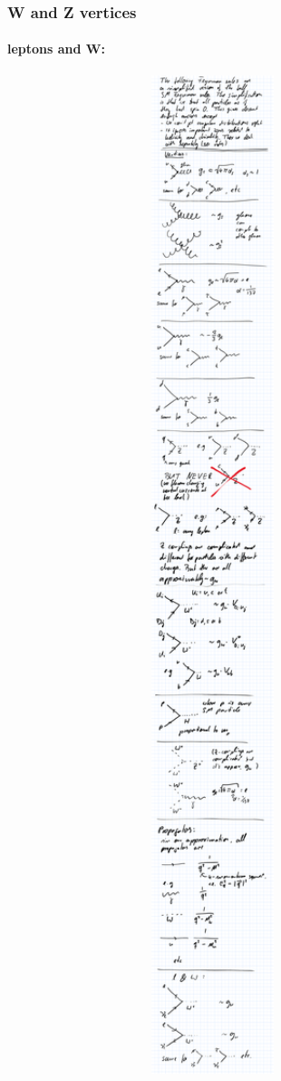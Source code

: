 \subsubsection{W and Z vertices}
\paragraph{leptons and W:\\}
\includegraphics[width=0.9\textwidth]{fig/summary/F_lW}
